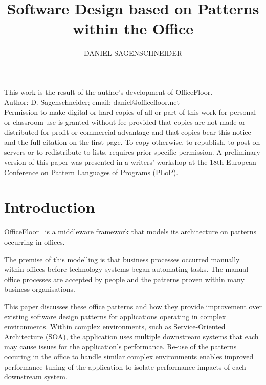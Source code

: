 \documentclass[prodmode]{style/acmlarge}
\title{Software Design based on Patterns within the Office}
\author{DANIEL SAGENSCHNEIDER \affil{OfficeFloor, daniel@officefloor.net}}
\begin{document}
\graphicspath{{./pdf/}}

\lstset{language=Java}

\captionsetup[lstlisting]{font=footnotesize}


\begin{bottomstuff}
This work is the result of the author's development of OfficeFloor.\\
Author: D. Sagenschneider; email: daniel@officefloor.net\\

Permission to make digital or hard copies of all or part of this work for
personal or classroom use is granted without fee provided that copies are not
made or distributed for profit or commercial advantage and that copies bear this
notice and the full citation on the first page. To copy otherwise, to republish,
to post on servers or to redistribute to lists, requires prior specific
permission. A preliminary version of this paper was presented in a writers'
workshop at the 18th European Conference on Pattern Languages of Programs
(PLoP).
\end{bottomstuff}

\maketitle




\section{Introduction}

OfficeFloor~\cite{officefloor} is a middleware framework that models its
architecture on patterns occurring in offices.

The premise of this modelling is that business processes occurred manually
within offices before technology systems began automating tasks.  The manual
office processes are accepted by people and the patterns proven within many
business organisations.

This paper discusses these office patterns and how they provide improvement over
existing software design patterns for applications operating in complex
environments.  Within complex environments, such as Service-Oriented
Architecture (SOA), the application uses multiple downstream systems that each
may cause issues for the application's performance.  Re-use of the patterns
occuring in the office to handle similar complex environments enables improved
performance tuning of the application to isolate performance impacts of each
downstream system.
\end{document}
